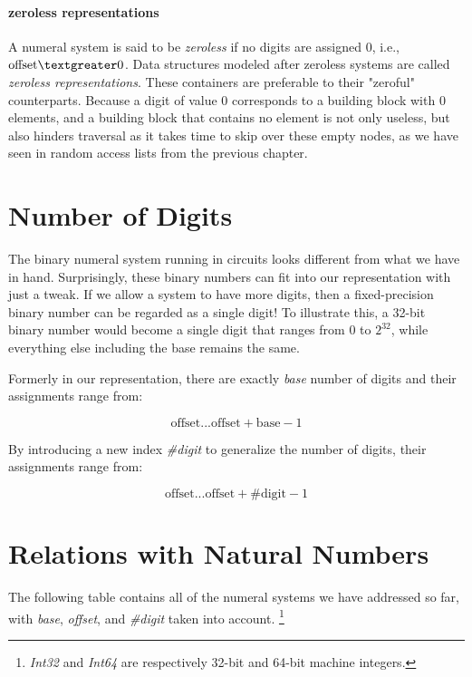 \documentclass[\main/thesis.tex]{subfiles}
\begin{document}
\paragraph{zeroless representations}
A numeral system is said to be \textit{zeroless} if no digits are assigned $ 0 $,
i.e., $ \text{offset} \textgreater 0 $.
Data structures modeled after zeroless systems are called \textit{zeroless representations}.
These containers are preferable to their "zeroful" counterparts.
Because a digit of value $ 0 $ corresponds to a building block with $ 0 $ elements,
and a building block that contains no element is not only useless,
but also hinders traversal as it takes time to skip over these empty nodes,
as we have seen in random access lists from the previous chapter.

\section{Number of Digits}

The binary numeral system running in circuits looks different from what we have
in hand.
Surprisingly, these binary numbers can fit into our representation with just a tweak.
If we allow a system to have more digits,
then a fixed-precision binary number can be regarded as a single digit!
To illustrate this,
a 32-bit binary number would become a single digit that ranges from $ 0 $ to $ 2^{32} $,
while everything else including the base remains the same.

Formerly in our representation,
there are exactly \textit{base} number of digits and their assignments range from:

$$
    \text{offset}  ...  \text{offset} + \text{base} - 1
$$

By introducing a new index \textit{\#digit} to generalize the number of digits,
their assignments range from:

$$
    \text{offset}  ...  \text{offset} + \text{\#digit} - 1
$$



\section{Relations with Natural Numbers}

The following table contains all of the numeral systems we have addressed so far,
with \textit{base}, \textit{offset}, and \textit{\#digit} taken into account.
\footnote{
\textit{Int32} and \textit{Int64} are respectively 32-bit and 64-bit machine
integers.
}
\end{document}
